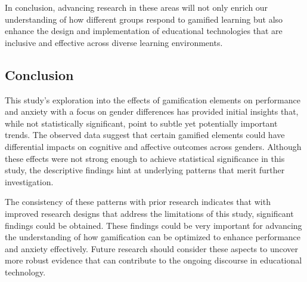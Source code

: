 In conclusion, advancing research in these areas will not only enrich our understanding of how different groups respond to gamified learning but also enhance the design and implementation of educational technologies that are inclusive and effective across diverse learning environments.

\subsection*{Conclusion}
This study's exploration into the effects of gamification elements on performance and anxiety with a focus on gender differences has provided initial insights that, while not statistically significant, point to subtle yet potentially important trends.
The observed data suggest that certain gamified elements could have differential impacts on cognitive and affective outcomes across genders.
Although these effects were not strong enough to achieve statistical significance in this study, the descriptive findings hint at underlying patterns that merit further investigation.

The consistency of these patterns with prior research indicates that with improved research designs that address the limitations of this study, significant findings could be obtained.
These findings could be very important for advancing the understanding of how gamification can be optimized to enhance performance and anxiety effectively.
Future research should consider these aspects to uncover more robust evidence that can contribute to the ongoing discourse in educational technology.
